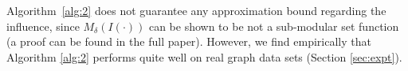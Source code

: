 Algorithm~\ref{alg:2}  does not guarantee any approximation bound regarding the influence, since $M_{\delta}(I(\cdot))$
can be shown to be not a sub-modular set function\cite{zhang:kdd14} (a proof can be found in the full paper).
However, we find empirically that Algorithm \ref{alg:2} performs quite well on real graph data sets (Section \ref{sec:expt}).
%
%





